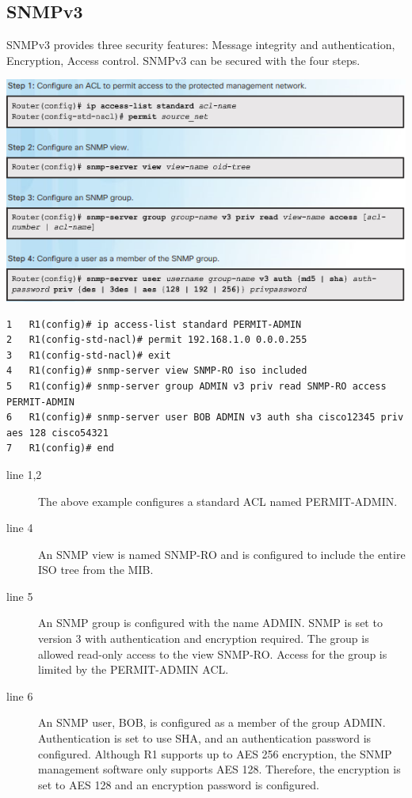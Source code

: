 \subsection{SNMPv3}
SNMPv3 provides three security features: Message integrity and authentication, Encryption, Access control. SNMPv3 can be secured with the four steps.\\
\begin{listing}
\includegraphics[scale=1]{pictures/SNMPv3steps.PNG} 
\end{listing}

\begin{verbatim}
1	R1(config)# ip access-list standard PERMIT-ADMIN
2	R1(config-std-nacl)# permit 192.168.1.0 0.0.0.255
3	R1(config-std-nacl)# exit
4	R1(config)# snmp-server view SNMP-RO iso included
5	R1(config)# snmp-server group ADMIN v3 priv read SNMP-RO access PERMIT-ADMIN
6	R1(config)# snmp-server user BOB ADMIN v3 auth sha cisco12345 priv aes 128 cisco54321
7	R1(config)# end
\end{verbatim}
\begin{description}
\item[line 1,2] The above example configures a standard ACL named PERMIT-ADMIN. 
\item[line 4] An SNMP view is named SNMP-RO and is configured to include the entire ISO tree from the MIB. 
\item[line 5] An SNMP group is configured with the name ADMIN. SNMP is set to version 3 with authentication and encryption required. The group is allowed read-only access to the view SNMP-RO. Access for the group is limited by the PERMIT-ADMIN ACL. 
\item[line 6] An SNMP user, BOB, is configured as a member of the group ADMIN. Authentication is set to use SHA, and an authentication password is configured. Although R1 supports up to AES 256 encryption, the SNMP management software only supports AES 128. Therefore, the encryption is set to AES 128 and an encryption password is configured.
\end{description}

